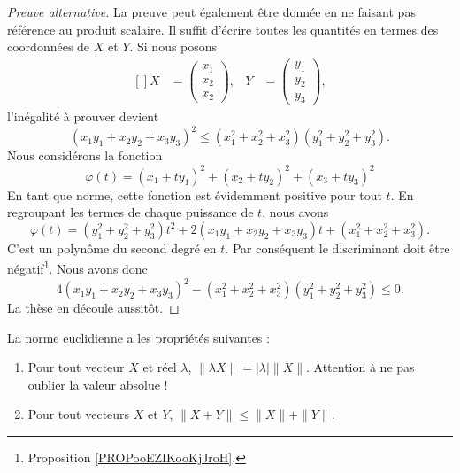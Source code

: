 \begin{proof}[Preuve alternative]
    La preuve peut également être donnée en ne faisant pas référence au produit scalaire. Il suffit d'écrire toutes les quantités en termes des coordonnées de $X$ et $Y$. Si nous posons
    \begin{equation}
        \begin{aligned}[]
            X&=\begin{pmatrix}
            x_1 \\
            x_2 \\
            x_2
          \end{pmatrix},
            &Y&=\begin{pmatrix}
            y_1 \\
            y_2 \\
            y_3
          \end{pmatrix},
        \end{aligned}
    \end{equation}
    l'inégalité à prouver devient
    \begin{equation}
        (x_1y_1+x_2y_2+x_3y_3)^2\leq (x_1^2+x_2^2+x_3^2)(y_1^2+y_2^2+y_3^2).
    \end{equation}
    Nous considérons la fonction
    \begin{equation}
        \varphi(t)=(x_1+ty_1)^2+(x_2+ty_2)^2+(x_3+ty_3)^2
    \end{equation}
    En tant que norme, cette fonction est évidemment positive pour tout $t$. En regroupant les termes de chaque puissance de $t$, nous avons
    \begin{equation}
        \varphi(t)=(y_1^2+y_2^2+y_3^2)t^2+2(x_1y_1+x_2y_2+x_3y_3)t+(x_1^2+x_2^2+x_3^2).
    \end{equation}
    C'est un polynôme du second degré en $t$. Par conséquent le discriminant doit être négatif\footnote{Proposition \ref{PROPooEZIKooKjJroH}.}. Nous avons donc
    \begin{equation}
        4(x_1y_1+x_2y_2+x_3y_3)^2-(x_1^2+x_2^2+x_3^2)(y_1^2+y_2^2+y_3^2)\leq 0.
    \end{equation}
    La thèse en découle aussitôt.
\end{proof}

\begin{proposition}     \label{PROPooVSVMooZrqxdc}
    La norme euclidienne a les propriétés suivantes :
    \begin{enumerate}
        \item
            Pour tout vecteur $X$ et réel $\lambda$,  $\| \lambda X \|=| \lambda |\| X \|$. Attention à ne pas oublier la valeur absolue !
        \item
            Pour tout vecteurs $X$ et $Y$, $\| X+Y \|\leq \| X \|+\| Y \|$.
    \end{enumerate}
\end{proposition}

